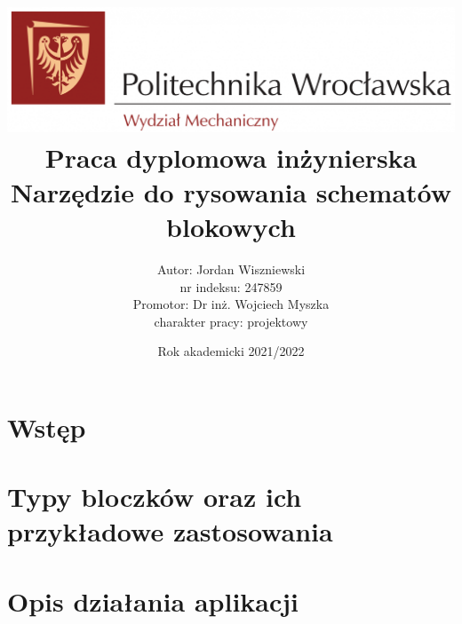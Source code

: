 \documentclass[12pt,a4paper]{report}
\author{
	{Autor: Jordan Wiszniewski}\\
	{nr indeksu: 247859}\\
	{Promotor: Dr inż. Wojciech Myszka}\\
	{charakter pracy: projektowy}
}
\date{Rok akademicki 2021/2022}
\title{
	{\includegraphics[width = \textwidth]{logo-pwr-wm.png}}
	{\bigbreak}
	{Praca dyplomowa inżynierska}\\
	{\bigbreak}
	\textbf{Narzędzie do rysowania schematów blokowych}
}
\begin{document}
\maketitle

\tableofcontents

\chapter{Wstęp}


\chapter{Typy bloczków oraz ich przykładowe zastosowania}


\chapter{Opis działania aplikacji}

\end{document}

